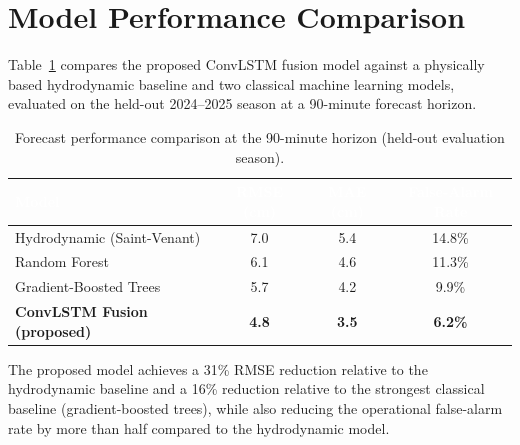 \section{Model Performance Comparison}
Table~\ref{tab:results} compares the proposed ConvLSTM fusion model against a physically based hydrodynamic baseline and two classical machine learning models, evaluated on the held-out 2024--2025 season at a 90-minute forecast horizon.

\begin{table}[htbp]
\centering
\caption{Forecast performance comparison at the 90-minute horizon (held-out evaluation season).}
\label{tab:results}
\renewcommand{\arraystretch}{1.3}
\begin{tabular}{@{}l c c c@{}}
\toprule
\rowcolor{chulapink}
\textcolor{white}{\textbf{Model}} & \textcolor{white}{\textbf{RMSE (cm)}} & \textcolor{white}{\textbf{MAE (cm)}} & \textcolor{white}{\textbf{False-Alarm Rate}} \\
\midrule
Hydrodynamic (Saint-Venant) & 7.0 & 5.4 & 14.8\% \\
Random Forest & 6.1 & 4.6 & 11.3\% \\
Gradient-Boosted Trees & 5.7 & 4.2 & 9.9\% \\
\rowcolor{chularose}
\textbf{ConvLSTM Fusion (proposed)} & \textbf{4.8} & \textbf{3.5} & \textbf{6.2\%} \\
\bottomrule
\end{tabular}
\end{table}

\noindent
The proposed model achieves a 31\% RMSE reduction relative to the hydrodynamic baseline and a 16\% reduction relative to the strongest classical baseline (gradient-boosted trees), while also reducing the operational false-alarm rate by more than half compared to the hydrodynamic model.
